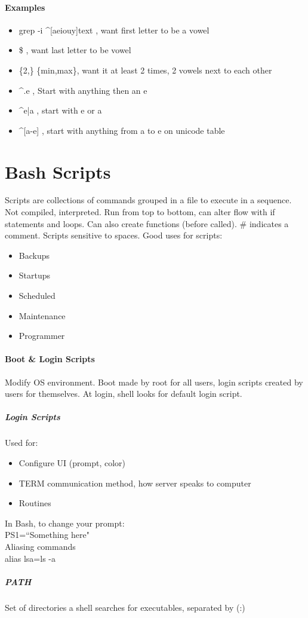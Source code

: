 \documentclass[12 pt]{article}
\begin{document}
	\paragraph{Examples}
	\begin{itemize}
		\item grep -i \textquotesingle \textasciicircum [aeiouy]\textquotesingle text , want first letter to be a vowel
		\item \textquotesingle [aeiouy]\$ \textquotesingle , want last letter to be vowel
		\item \textquotesingle [aeiouy]\{2,\} \textquotesingle \{min,max\}, want it at least 2 times, 2 vowels next to each other
		\item \textquotesingle \textasciicircum.e \textquotesingle, Start with anything then an e
		\item \textquotesingle \textasciicircum e|a \textquotesingle, start with e or a
		\item \textquotesingle \textasciicircum [a-e] \textquotesingle, start with anything from a to e on unicode table
	\end{itemize}
	\section{Bash Scripts} Scripts are collections of commands grouped in a file to execute in a sequence. Not compiled, interpreted. Run from top to bottom, can alter flow with if statements and loops. Can also create functions (before called). \# indicates a comment. Scripts sensitive to spaces. Good uses for scripts: 
	\begin{itemize}
		\item Backups
		\item Startups
		\item Scheduled
		\item Maintenance
		\item Programmer
	\end{itemize}
	\paragraph{Boot \& Login Scripts} Modify OS environment. Boot made by root for all users, login scripts created by users for themselves. At login, shell looks for default login script.
	\subparagraph{Login Scripts} Used for:
	\begin{itemize}
		\item Configure UI (prompt, color)
		\item TERM communication method, how server speaks to computer
		\item Routines
		\end{itemize}
		In Bash, to change your prompt:
		\\ PS1=``Something here"
		\\ Aliasing commands
		\\ alias lsa=\textquotesingle ls -a\textquotesingle
		\subparagraph{PATH}
		Set of directories a shell searches for executables, separated by (:)
\end{document}
